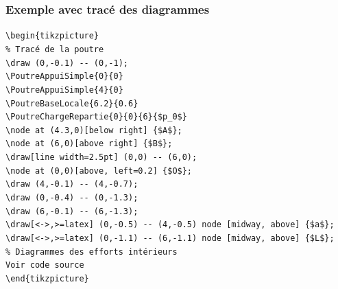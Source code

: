 \documentclass[11pt]{ltxdockit}[2010/09/26]
\begin{document}
\subsubsection{Exemple avec tracé des diagrammes}
\noindent\verb!\begin{tikzpicture}!\\
\indent\verb!% Tracé de la poutre!\\
\indent\verb!\draw (0,-0.1) -- (0,-1);!\\
\indent\verb!\PoutreAppuiSimple{0}{0}!\\
\indent\verb!\PoutreAppuiSimple{4}{0}!\\
\indent\verb!\PoutreBaseLocale{6.2}{0.6}!\\
\indent\verb!\PoutreChargeRepartie{0}{0}{6}{$p_0$}!\\
\indent\verb!\node at (4.3,0)[below right] {$A$};!\\
\indent\verb!\node at (6,0)[above right] {$B$};!\\
\indent\verb!\draw[line width=2.5pt] (0,0) -- (6,0);!\\
\indent\verb!\node at (0,0)[above, left=0.2] {$O$};!\\
\indent\verb!\draw (4,-0.1) -- (4,-0.7);!\\
\indent\verb!\draw (0,-0.4) -- (0,-1.3);!\\
\indent\verb!\draw (6,-0.1) -- (6,-1.3);!\\
\indent\verb!\draw[<->,>=latex] (0,-0.5) -- (4,-0.5) node [midway, above] {$a$};!\\
\indent\verb!\draw[<->,>=latex] (0,-1.1) -- (6,-1.1) node [midway, above] {$L$};!\\

\indent\verb!% Diagrammes des efforts intérieurs!\\
\indent\verb!Voir code source!\\
\verb!\end{tikzpicture}!
\end{document}
